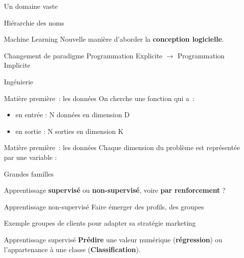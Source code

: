 \begin{frame}{Un domaine vaste}
\end{frame}

\begin{frame}{Hiérarchie des noms}
\end{frame}

\begin{frame}{Machine Learning}
  Nouvelle manière d'aborder la \textbf{conception logicielle}.
  \vfill
  \begin{block}{Changement de paradigme}
  Programmation Explicite $\rightarrow$ Programmation Implicite
  \end{block}
\end{frame}

\begin{frame}{Ingénierie}
\end{frame}

\begin{frame}{Matière première~: les données}
  On cherche une fonction qui a~:
  \begin{itemize}
    \item en entrée : N données en dimension D
    \item en sortie : N sorties en dimension K
  \end{itemize}
\end{frame}

\begin{frame}{Matière première~: les données}
  Chaque dimension du problème est représentée par une variable : 
\end{frame}

\begin{frame}{Grandes familles}

  Apprentissage \textbf{supervisé} ou \textbf{non-supervisé}, voire \textbf{par renforcement} ?
\end{frame}

\begin{frame}{Apprentissage non-supervisé}
  Faire émerger des profils, des groupes
  \vfill
  \begin{exampleblock}{Exemple}
  groupes de clients pour adapter sa stratégie marketing
  \end{exampleblock}
\end{frame}

\begin{frame}{Apprentissage supervisé}
  \textbf{Prédire} une valeur numérique (\textbf{régression}) ou l'appartenance à une classe (\textbf{Classification}).
\end{frame}

